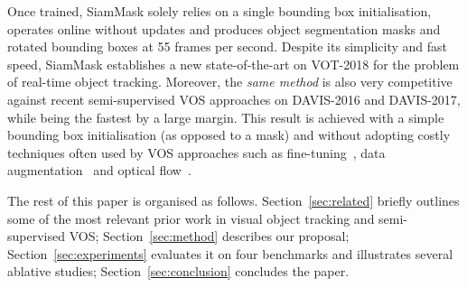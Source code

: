 Once trained, SiamMask solely relies on a single bounding box initialisation, operates online without updates and produces object segmentation masks and rotated bounding boxes at 55 frames per second.
Despite its simplicity and fast speed, SiamMask establishes a new state-of-the-art on VOT-2018 for the problem of real-time object tracking.
Moreover, the \emph{same method} is also very competitive against recent semi-supervised VOS approaches on DAVIS-2016 and DAVIS-2017, while being the fastest by a large margin.
This result is achieved with a simple bounding box initialisation (as opposed to a mask) and without adopting costly techniques often used by VOS approaches such as fine-tuning~\cite{maninis2017video,perazzi2017learning,bao2018cnn,voigtlaender2017online}, data augmentation~\cite{LucidDataDreaming_CVPR17_workshops,li2018video} and optical flow~\cite{tsai2016video,bao2018cnn,perazzi2017learning,li2018video,cheng2018fast}.

The rest of this paper is organised as follows.
Section~\ref{sec:related} briefly outlines some of the most relevant prior work in visual object tracking and semi-supervised VOS; Section~\ref{sec:method} describes our proposal; Section~\ref{sec:experiments} evaluates it on four benchmarks and illustrates several ablative studies; Section~\ref{sec:conclusion} concludes the paper.
